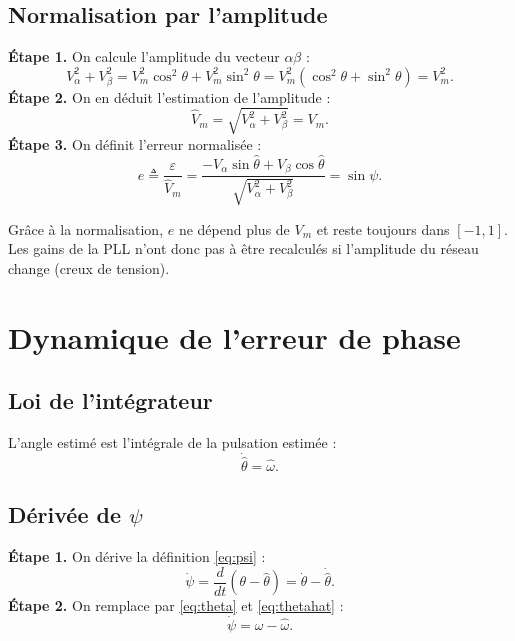 \documentclass[11pt,a4paper]{article}
\numberwithin{equation}{section}
\theoremstyle{plain}
\theoremstyle{definition}
\theoremstyle{remark}
\newcommand{\hth}{\hat{\theta}}
\newcommand{\hw}{\hat{\omega}}
\begin{document}
\subsection{Normalisation par l'amplitude}
\textbf{Étape 1.} On calcule l'amplitude du vecteur $\alpha\beta$ :
\begin{equation}
V_\alpha^2+V_\beta^2 = V_m^2\cos^2\theta+V_m^2\sin^2\theta = V_m^2(\cos^2\theta+\sin^2\theta) = V_m^2 .
\end{equation}
\textbf{Étape 2.} On en déduit l'estimation de l'amplitude :
\begin{equation}
\hat V_m = \sqrt{V_\alpha^2+V_\beta^2} = V_m .
\end{equation}
\textbf{Étape 3.} On définit l'erreur normalisée :
\begin{equation}\label{eq:e}
\boxed{e \triangleq \frac{\varepsilon}{\hat V_m} = \frac{-V_\alpha\sin\hth+V_\beta\cos\hth}{\sqrt{V_\alpha^2+V_\beta^2}} = \sin\psi .}
\end{equation}
\begin{idee}
Grâce à la normalisation, $e$ ne dépend plus de $V_m$ et reste toujours dans $[-1,1]$.
Les gains de la PLL n'ont donc pas à être recalculés si l'amplitude du réseau change (creux de tension).
\end{idee}

\section{Dynamique de l'erreur de phase}

\subsection{Loi de l'intégrateur}
L'angle estimé est l'intégrale de la pulsation estimée :
\begin{equation}\label{eq:thetahat}
\dot\hth = \hw .
\end{equation}

\subsection{Dérivée de $\psi$}
\textbf{Étape 1.} On dérive la définition \eqref{eq:psi} :
\begin{equation}
\dot\psi = \frac{d}{dt}(\theta-\hth) = \dot\theta-\dot\hth .
\end{equation}
\textbf{Étape 2.} On remplace par \eqref{eq:theta} et \eqref{eq:thetahat} :
\begin{equation}\label{eq:psidot}
\boxed{\dot\psi = \omega-\hw .}
\end{equation}
\end{document}
